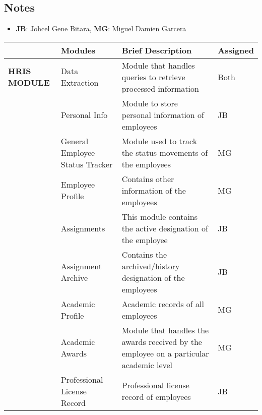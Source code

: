 \subsection*{Notes}
\begin{itemize}
    \item[] \textbf{JB}: Johcel Gene Bitara, \textbf{MG}: Miguel Damien Garcera
\end{itemize}

\begin{table}[H]
    \begin{tabularx}{\textwidth}{|p{2cm}|p{3.5cm}|X|p{1.5cm}|}
        \toprule
        \multicolumn{1}{|l|}{} & \textbf{Modules}                  & \textbf{Brief Description}                                                            & \textbf{Assigned} \\ \midrule
    \textbf{HRIS MODULE} & Data Extraction                         & Module that handles queries to retrieve processed information                         & Both             \\
                        & Personal Info                            & Module to store personal information of employees                                     & JB               \\
                        & General Employee Status Tracker          & Module used to track the status movements of the employees                            & MG               \\
                        & Employee Profile                         & Contains other information of the employees                                           & MG               \\
                        & Assignments                              & This module contains the active designation of the employee                           & JB               \\
                        & Assignment Archive                       & Contains the archived/history designation of the employees                            & JB               \\
                        & Academic Profile                         & Academic records of all employees                                                     & MG               \\
                        & Academic Awards                          & Module that handles the awards received by the employee on a particular academic level& MG               \\
                        & Professional License Record              & Professional license record of employees                                              & JB               \\

\end{tabularx}
\end{table}
